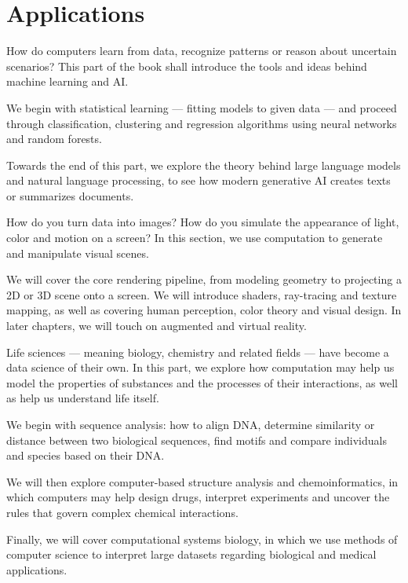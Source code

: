 \section{Applications}
\begin{itemize}
  How do computers learn from data, recognize patterns or reason about uncertain
  scenarios? This part of the book shall introduce the tools and ideas behind
  machine learning and AI\@.

  We begin with statistical learning --- fitting models to given data --- and
  proceed through classification, clustering and regression algorithms using
  neural networks and random forests.

  Towards the end of this part, we explore the theory behind large language
  models and natural language processing, to see how modern generative AI
  creates texts or summarizes documents.

  How do you turn data into images? How do you simulate the appearance of light,
  color and motion on a screen? In this section, we use computation to generate
  and manipulate visual scenes.

  We will cover the core rendering pipeline, from modeling geometry to
  projecting a 2D or 3D scene onto a screen. We will introduce shaders,
  ray-tracing and texture mapping, as well as covering human perception,
  color theory and visual design.
  In later chapters, we will touch on augmented and virtual reality.

  Life sciences --- meaning biology, chemistry and related fields --- have
  become a data science of their own. In this part, we explore how computation
  may help us model the properties of substances and the processes of their
  interactions, as well as help us understand life itself.

  We begin with sequence analysis: how to align DNA, determine similarity or
  distance between two biological sequences, find motifs and compare individuals and
  species based on their DNA\@.

  We will then explore computer-based structure analysis and chemoinformatics,
  in which computers may help design drugs, interpret experiments and uncover
  the rules that govern complex chemical interactions.

  Finally, we will cover computational systems biology, in which we use methods
  of computer science to interpret large datasets regarding biological and
  medical applications.
\end{itemize}
